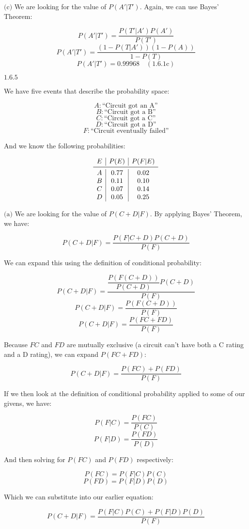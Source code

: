 \documentclass{article}
\newcommand{\problem}[2]{$\boxed{\text{#1.#2}}$}
\newcommand{\subproblem}[3]{$\boxed{\text{(#3)}}$}
\newcommand{\subsolution}[4]{\boxed{#4\quad(\text{#1.#2#3})}}
\begin{document}
%
\subproblem{1.6}{1}{c} We are looking for the value of
$P(A'|T')$. Again, we can use Bayes' Theorem:

\[
P(A'|T')=\dfrac{P(T'|A')P(A')}{P(T')}
\] \[
P(A'|T')=\dfrac{(1-P(T|A'))(1-P(A))}{1-P(T)}
\] \[
\subsolution{1.6}{1}{c}{P(A'|T')=0.99968}
\]

%
\problem{1.6}{5}

We have five events that describe the probability space:

\[
A:\text{``Circuit got an A''}
\] \[
B:\text{``Circuit got a B''}
\] \[
C:\text{``Circuit got a C''}
\] \[
D:\text{``Circuit got a D''}
\] \[
F:\text{``Circuit eventually failed''}
\]

And we know the following probabilities:

\[
\begin{array}{c|c|c}
E & P(E) & P(F|E) \\
\midrule
A & 0.77 & 0.02 \\
B & 0.11 & 0.10 \\
C & 0.07 & 0.14 \\
D & 0.05 & 0.25 \\
\end{array}
\]

%
\subproblem{1.6}{5}{a} We are looking for the value of $P(C+D|F)$. By
applying Bayes' Theorem, we have:

\[
P(C+D|F)=\dfrac{P(F|C+D)P(C+D)}{P(F)}
\]

We can expand this using the definition of conditional probability:

\[
P(C+D|F)=\dfrac{\dfrac{P(F(C+D))}{P(C+D)}P(C+D)}{P(F)}
\] \[
P(C+D|F)=\dfrac{P(F(C+D))}{P(F)}
\] \[
P(C+D|F)=\dfrac{P(FC+FD)}{P(F)}
\]

Because $FC$ and $FD$ are mutually exclusive (a circuit can't have
both a C rating and a D rating), we can expand $P(FC+FD)$:

\[
P(C+D|F)=\dfrac{P(FC)+P(FD)}{P(F)}
\]

If we then look at the definition of conditional probability applied
to some of our givens, we have:

\[
P(F|C)=\dfrac{P(FC)}{P(C)}
\] \[
P(F|D)=\dfrac{P(FD)}{P(D)}
\]

And then solving for $P(FC)$ and $P(FD)$ respectively:

\[
P(FC)=P(F|C)P(C)
\] \[
P(FD)=P(F|D)P(D)
\]

Which we can substitute into our earlier equation:

\[
P(C+D|F)=\dfrac{P(F|C)P(C)+P(F|D)P(D)}{P(F)}
\]
\end{document}
